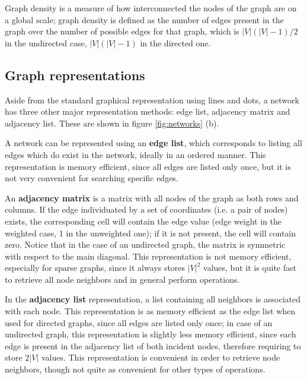Graph density is a measure of how interconnected the nodes of the graph are on a global scale; graph density is defined as the number of edges present in the graph over the number of possible edges for that graph, which is $|V|(|V|-1)/2$ in the undirected case, $|V|(|V|-1)$ in the directed one. 

\subsection{Graph representations} 

Aside from the standard graphical representation using lines and dots, a network has three other major representation methods: edge list, adjacency matrix and adjacency list. These are shown in figure \ref{fig:networks} (b).

A network can be represented using an \textbf{edge list}, which corresponds to listing all edges which do exist in the network, ideally in an ordered manner. This representation is memory efficient, since all edges are listed only once, but it is not very convenient for searching specific edges.

An \textbf{adjacency matrix} is a matrix with all nodes of the graph as both rows and columns. If the edge individuated by a set of coordinates (i.e. a pair of nodes) exists, the corresponding cell will contain the edge value (edge weight in the weighted case, 1 in the unweighted one); if it is not present, the cell will contain zero. Notice that in the case of an undirected graph, the matrix is symmetric with respect to the main diagonal. This representation is not memory efficient, especially for sparse graphs, since it always stores $|V|^2$ values, but it is quite fast to retrieve all node neighbors and in general perform operations. 

In the \textbf{adjacency list} representation, a list containing all neighbors is associated with each node. This representation is as memory efficient as the edge list when used for directed graphs, since all edges are listed only once; in case of an undirected graph, this representation is slightly less memory efficient, since each edge is present in the adjacency list of both incident nodes, therefore requiring to store $2|V|$ values. This representation is convenient in order to retrieve node neighbors, though not quite as convenient for other types of operations. 

